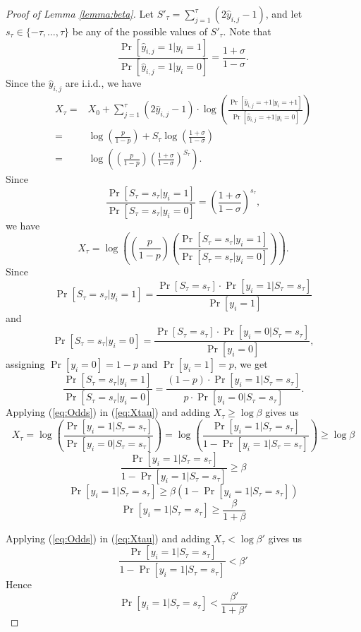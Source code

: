 \begin{proof}[Proof of Lemma \ref{lemma:beta}]
Let $S'_{\tau}=\sum_{j=1}^\tau (2\hat{y}_{i,j}-1)$, and let $s_{\tau}\in\{-\tau,\dots,\tau\}$ be any of the possible values of $S'_\tau$. Note that
\[
\frac{\Pr[\hat{y}_{i,j}=1|y_i=1]}{\Pr[\hat{y}_{i,j}=1|y_i=0]}=\frac{1+\sigma}{1-\sigma}.
\]
Since the $\hat{y}_{i,j}$  are i.i.d., we have
\begin{align*}
X_{\tau}=&X_0+\sum_{j=1}^\tau(2\hat{y}_{i,j}-1)\cdot
    \log(\frac{\Pr[\hat{y}_{i,j}=+1|y_i=+1]}{\Pr[\hat{y}_{i,j}=+1|y_i=0]})\\
%
= &\log(\frac{p}{1-p})+S_{\tau}\log(\frac{1+\sigma}{1-\sigma})\\
%
=& \log((\frac{p}{1-p}) (\frac{1+\sigma}{1-\sigma})^{S_{\tau}}).
\end{align*}
Since
\[
\frac{\Pr[S_{\tau}=s_{\tau}|y_i=1]}{\Pr[S_{\tau}=s_{\tau}|y_i=0]}=(\frac{1+\sigma}{1-\sigma})^{s_\tau},
\]
we have
\begin{equation}\label{eq:Xtau}
X_\tau= \log((\frac{p}{1-p}) (\frac{\Pr[S_{\tau}=s_{\tau}|y_i=1]}{\Pr[S_{\tau}=s_{\tau}|y_i=0]})).
\end{equation}
Since 
\[
\Pr[S_{\tau}=s_{\tau}|y_i=1]=\frac{\Pr[S_{\tau}=s_{\tau}]\cdot \Pr[y_i=1|S_{\tau}=s_{\tau}]}{\Pr[y_i=1]}
\]
and 
\[
\Pr[S_{\tau}=s_{\tau}|y_i=0]=\frac{\Pr[S_{\tau}=s_{\tau}]\cdot \Pr[y_i=0|S_{\tau}=s_{\tau}]}{\Pr[y_i=0]},
\]
assigning $\Pr[y_i=0]=1-p$ and $\Pr[y_i=1]=p$, 
we get
\begin{equation}\label{eq:Odds}
\frac{\Pr[S_{\tau}=s_{\tau}|y_i=1]}{\Pr[S_{\tau}=s_{\tau}|y_i=0]}=
\frac{(1-p)\cdot\Pr[y_i=1|S_{\tau}=s_{\tau}]}{p\cdot\Pr[y_i=0|S_{\tau}=s_{\tau}]}.
\end{equation}
Applying (\ref{eq:Odds}) in (\ref{eq:Xtau}) and adding $X_\tau\geq\log \beta$ gives us
\[
X_\tau= \log \left(\frac{\Pr[y_i=1|S_{\tau}=s_{\tau}]}{\Pr[y_i=0|S_{\tau}=s_{\tau}]}\right)=\log\left(\frac{\Pr[y_i=1|S_{\tau}=s_{\tau}]}{1-\Pr[y_i=1|S_{\tau}=s_{\tau}]}\right)\geq \log \beta
\]
\[
\frac{\Pr[y_i=1|S_{\tau}=s_{\tau}]}{1-\Pr[y_i=1|S_{\tau}=s_{\tau}]}\geq  \beta
\]
\[
\Pr[y_i=1|S_{\tau}=s_{\tau}]\geq  \beta(1-\Pr[y_i=1|S_{\tau}=s_{\tau}])
\]
\[
\Pr[y_i=1|S_{\tau}=s_{\tau}]\geq  \frac{\beta}{1+\beta}
\]

Applying (\ref{eq:Odds}) in (\ref{eq:Xtau}) and adding $X_\tau<\log \beta'$ gives us
\[
\frac{\Pr[y_i=1|S_{\tau}=s_{\tau}]}{1-\Pr[y_i=1|S_{\tau}=s_{\tau}]}<  \beta'
\]
Hence
\[
\Pr[y_i=1|S_{\tau}=s_{\tau}]< \frac{\beta'}{1+\beta'}
\]
\end{proof}

